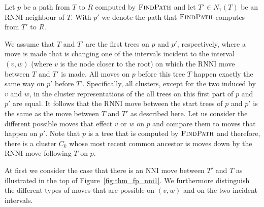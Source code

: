 \documentclass{amsart}
\newcommand{\rnni}{\mathrm{RNNI}}
\newcommand{\findpath}{\textsc{FindPath}}
\newcommand{\nni}{\mathrm{NNI}}
\begin{document}
\proof

Let $p$ be a path from $T$ to $R$ computed by $\findpath$ and let $T' \in N_1(T)$ be an $\rnni$ neighbour of $T$.
With $p'$ we denote the path that $\findpath$ computes from $T'$ to $R$.

We assume that $T$ and $T'$ are the first trees on $p$ and $p'$, respectively, where a move is made that is changing one of the intervals incident to the interval $(v,w)$ (where $v$ is the node closer to the root) on which the $\rnni$ move between $T$ and $T'$ is made.
All moves on $p$ before this tree $T$ happen exactly the same way on $p'$ before $T'$.
Specifically, all clusters, except for the two induced by $v$ and $w$, in the cluster representations of the all trees on this first part of $p$ and $p'$ are equal.
It follows that the $\rnni$ move between the start trees of $p$ and $p'$ is the same as the move between $T$ and $T'$ as described here.
Let us consider the different possible moves that effect $v$ or $w$ on $p$ and compare them to moves that happen on $p'$.
Note that $p$ is a tree that is computed by $\findpath$ and therefore, there is a cluster $C_k$ whose most recent common ancestor is moves down by the $\rnni$ move following $T$ on $p$.

At first we consider the case that there is an $\nni$ move between $T'$ and $T$ as illustrated in the top of Figure~\ref{fig:thm_fp_nni1}.
We furthermore distinguish the different types of moves that are possible on $(v,w)$ and on the two incident intervals.
\end{document}
